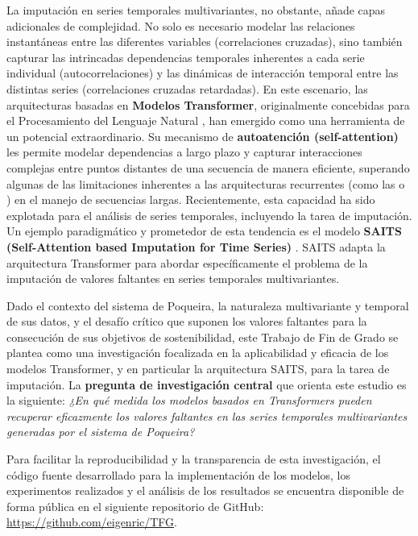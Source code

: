 La imputación en series temporales multivariantes, no obstante, añade capas adicionales de complejidad. No solo es necesario modelar las relaciones instantáneas entre las diferentes variables (correlaciones cruzadas), sino también capturar las intrincadas dependencias temporales inherentes a cada serie individual (autocorrelaciones) y las dinámicas de interacción temporal entre las distintas series (correlaciones cruzadas retardadas). En este escenario, las arquitecturas basadas en \textbf{Modelos Transformer}, originalmente concebidas para el Procesamiento del Lenguaje Natural \citep{Vaswani2017}, han emergido como una herramienta de un potencial extraordinario. Su mecanismo de \textbf{autoatención (self-attention)} les permite modelar dependencias a largo plazo y capturar interacciones complejas entre puntos distantes de una secuencia de manera eficiente, superando algunas de las limitaciones inherentes a las arquitecturas recurrentes (como las  o ) en el manejo de secuencias largas. Recientemente, esta capacidad ha sido explotada para el análisis de series temporales, incluyendo la tarea de imputación. Un ejemplo paradigmático y prometedor de esta tendencia es el modelo \textbf{SAITS (Self-Attention based Imputation for Time Series)} \citep{Du2023SAITS}. SAITS adapta la arquitectura Transformer para abordar específicamente el problema de la imputación de valores faltantes en series temporales multivariantes.


Dado el contexto del sistema  de Poqueira, la naturaleza multivariante y temporal de sus datos, y el desafío crítico que suponen los valores faltantes para la consecución de sus objetivos de sostenibilidad, este Trabajo de Fin de Grado se plantea como una investigación focalizada en la aplicabilidad y eficacia de los modelos Transformer, y en particular la arquitectura SAITS, para la tarea de imputación. La \textbf{pregunta de investigación central} que orienta este estudio es la siguiente: \textit{¿En qué medida los modelos basados en Transformers pueden recuperar eficazmente los valores faltantes en las series temporales multivariantes generadas por el sistema  de Poqueira?}

Para facilitar la reproducibilidad y la transparencia de esta investigación, el código fuente desarrollado para la implementación de los modelos, los experimentos realizados y el análisis de los resultados se encuentra disponible de forma pública en el siguiente repositorio de GitHub: \url{https://github.com/eigenric/TFG}.

